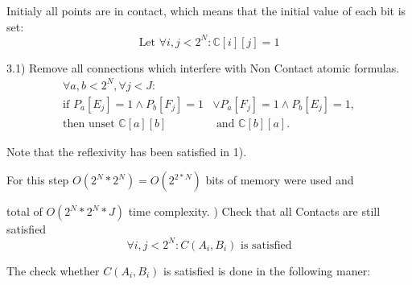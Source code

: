 \documentclass{article}
\begin{document}
			Initialy all points are in contact, which means that the initial value of each bit is set:
			\begin{equation}
				\text{Let } \forall i, j < 2^N : \mathbb{C}[ i ][ j ] = 1
			\end{equation}
	
			3.1) Remove all connections which interfere with Non Contact atomic formulas.
				\begin{align*}
					\forall a, b < 2^N, \forall j < J :& \\
						\text{if } P_a [E_j] = 1 \wedge P_b [F_j] = 1 &\vee P_a[F_j] = 1 \wedge P_b[E_j] = 1, \\
						\text{then unset } \mathbb{C}[a][b] &\text{ and } \mathbb{C}[b][a].
				\end{align*} 
				
			Note that the reflexivity has been satisfied in 1).
			\newline

			For this step $O(2^N * 2^N) = O(2^{2*N})$ bits of memory were used and 

			total of $O(2^N * 2^N * J)$ time complexity.
			\newline
			) Check that all Contacts are still satisfied
			\begin{equation}
				\forall i, j < 2^N: C(A_i, B_i) \text{ is satisfied}
			\end{equation}
			
			The check whether $C(A_i, B_i)$ is satisfied is done in the following maner:
			
\end{document}
